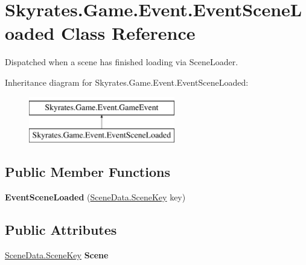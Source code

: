 \hypertarget{class_skyrates_1_1_game_1_1_event_1_1_event_scene_loaded}{\section{Skyrates.\-Game.\-Event.\-Event\-Scene\-Loaded Class Reference}
\label{class_skyrates_1_1_game_1_1_event_1_1_event_scene_loaded}
}


Dispatched when a scene has finished loading via Scene\-Loader.  


Inheritance diagram for Skyrates.\-Game.\-Event.\-Event\-Scene\-Loaded\-:\begin{figure}[H]
\begin{center}
\leavevmode
\includegraphics[height=2.000000cm]{class_skyrates_1_1_game_1_1_event_1_1_event_scene_loaded}
\end{center}
\end{figure}
\subsection*{Public Member Functions}
\begin{DoxyCompactItemize}
\item 
\hypertarget{class_skyrates_1_1_game_1_1_event_1_1_event_scene_loaded_a740ed23b511192a1c970cf81090d9cff}{{\bfseries Event\-Scene\-Loaded} (\hyperlink{class_skyrates_1_1_scene_1_1_scene_data_a466c9423ed3d053f5513e19abcf76b75}{Scene\-Data.\-Scene\-Key} key)}\label{class_skyrates_1_1_game_1_1_event_1_1_event_scene_loaded_a740ed23b511192a1c970cf81090d9cff}

\end{DoxyCompactItemize}
\subsection*{Public Attributes}
\begin{DoxyCompactItemize}
\item 
\hypertarget{class_skyrates_1_1_game_1_1_event_1_1_event_scene_loaded_a355c0687400178b15daebf625431ed3c}{\hyperlink{class_skyrates_1_1_scene_1_1_scene_data_a466c9423ed3d053f5513e19abcf76b75}{Scene\-Data.\-Scene\-Key} {\bfseries Scene}}\label{class_skyrates_1_1_game_1_1_event_1_1_event_scene_loaded_a355c0687400178b15daebf625431ed3c}

\end{DoxyCompactItemize}


